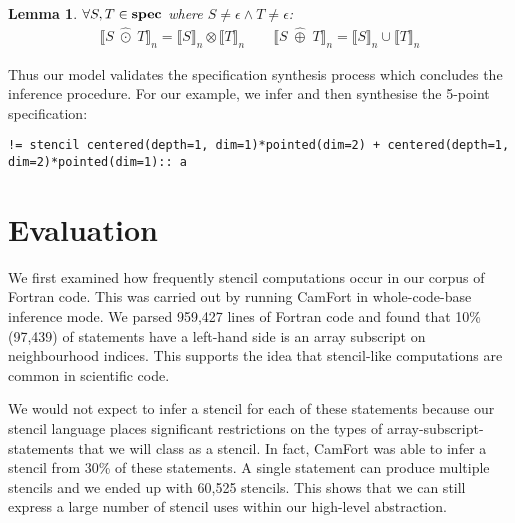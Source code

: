 \documentclass[10pt,preprint,numbers]{sigplanconf}
\newcounter{block}
\newtheorem{lemma}[block]{Lemma}
\theoremstyle{definition}
\newcommand{\interp}[1]{\llbracket{#1}\rrbracket}
\begin{document}
\begin{lemma}%
$\forall S,
  T \in \textbf{spec}$ where $S\!\neq \epsilon \wedge T\!\neq \epsilon$:
\begin{align*}
\interp{S \; \hat{\odot} \; T}_n = \interp{S}_n \otimes \interp{T}_n
  \qquad
\interp{S \; \hat{\oplus} \; T}_n = \interp{S}_n \cup \interp{T}_n
\end{align*}
\label{lem:alg-soundness}
\vspace{-2em}
\end{lemma}
%
\noindent
Thus our model validates the specification synthesis process which concludes the
inference procedure. For our example, we infer and then synthesise the
5-point specification:
\begin{verbatim}
!= stencil centered(depth=1, dim=1)*pointed(dim=2) + centered(depth=1, dim=2)*pointed(dim=1):: a
\end{verbatim}

\section{Evaluation}




We first examined how frequently stencil computations occur in our
corpus of Fortran code. This was carried out by running CamFort in
whole-code-base inference mode. We parsed 959,427 lines of Fortran
code and found that 10\% (97,439) of statements have a left-hand side
is an array subscript on neighbourhood indices. This supports the idea
that stencil-like computations are common in scientific code. 

We would not expect to infer a stencil for each of these statements
because our stencil language places significant restrictions on the
types of array-subscript-statements that we will class as a
stencil. In fact, CamFort was able to infer a stencil from 30\% of
these statements. A single statement can produce multiple stencils and
we ended up with 60,525 stencils. This shows that we can still express
a large number of stencil uses within our high-level abstraction.
\end{document}
